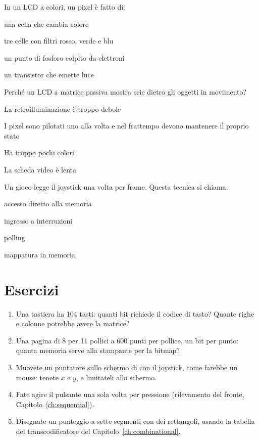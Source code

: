 \begin{quiz}{In un LCD a colori, un pixel è fatto di:}
\item una cella che cambia colore
\item tre celle con filtri rosso, verde e blu
\item un punto di fosforo colpito da elettroni
\item un transistor che emette luce
\end{quiz}

\begin{quiz}{Perché un LCD a matrice passiva mostra scie dietro gli oggetti in movimento?}
\item La retroilluminazione è troppo debole
\item I pixel sono pilotati uno alla volta e nel frattempo devono mantenere il proprio stato
\item Ha troppo pochi colori
\item La scheda video è lenta
\end{quiz}

\begin{quiz}{Un gioco \prg legge il joystick una volta per frame. Questa tecnica si chiama:}
\item accesso diretto alla memoria
\item ingresso a interruzioni
\item polling
\item mappatura in memoria
\end{quiz}

\section{Esercizi}

\begin{exercise}
\begin{enumerate}[nosep]
\item Una tastiera ha 104 tasti: quanti bit richiede il codice di tasto?
  Quante righe e colonne potrebbe avere la matrice?
\item Una pagina di 8 per 11 pollici a 600 punti per pollice, un bit per
  punto: quanta memoria serve alla stampante per la bitmap?
\item Muovete un puntatore sullo schermo di \prg con il joystick, come farebbe
  un mouse: tenete $x$ e $y$, e limitateli allo schermo.
\item Fate agire il pulsante  una sola volta per pressione (rilevamento
  del fronte, Capitolo~\ref{ch:sequential}).
\item Disegnate un punteggio a sette segmenti con dei rettangoli, usando la
  tabella del transcodificatore del Capitolo~\ref{ch:combinational}.
\end{enumerate}
\end{exercise}

